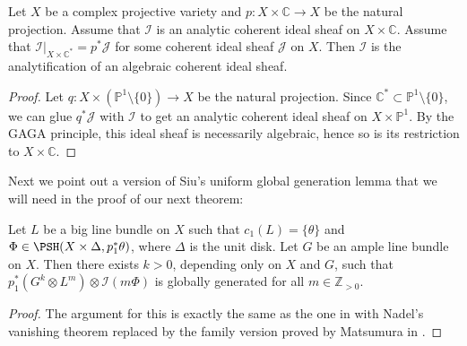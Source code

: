 \begin{lemma}\label{lma:GAGA}
Let $X$ be a complex projective variety and $p:X\times \mathbb{C}\rightarrow X$ be the natural projection. Assume that $\mathcal{I}$ is an analytic coherent ideal sheaf on $X\times \mathbb{C}$. Assume that $\mathcal{I}|_{X \times \mathbb C^*}=p^*\mathcal{J}$ for some coherent ideal sheaf $\mathcal{J}$ on $X$. Then $\mathcal{I}$ is the analytification of an algebraic coherent ideal sheaf.
\end{lemma}



\begin{proof}
    Let $q:X\times (\mathbb{P}^1\setminus \{0\})\rightarrow X$ be the natural projection. Since $\mathbb C^* \subset \mathbb{P}^1\setminus \{0\}$, we can glue $q^*\mathcal{J}$ with $\mathcal{I}$ to get an analytic coherent ideal sheaf on $X\times \mathbb{P}^1$. By the GAGA principle, this ideal sheaf is necessarily algebraic, hence so is its restriction to $X\times \mathbb{C}$.
\end{proof}

Next we point out a version of Siu's uniform global generation lemma \cite{Siu88} that we will need in the proof of our next theorem:

\begin{lemma}\label{lma:Siu_global_uniform_generatedness} Let $L$ be a big line bundle on $X$ such that $c_1(L) = \{\theta\}$ and $\Phi \in \PSH(X\times \Delta, p_1^*\theta)$, where $\Delta$ is the unit disk. Let $G$ be an ample line bundle on $X$. Then there exists $k>0$, depending only on $X$ and $G$, such that $p_1^*(G^k \otimes L^m)\otimes \mathcal I(m \Phi)$ is globally generated for all $m \in \mathbb{Z}_{>0}$.
\end{lemma}

\begin{proof} The argument for this is exactly the same as the one in \cite[Lemma~5.6]{BBJ21} with Nadel's vanishing theorem replaced by the family version proved by Matsumura in \cite[Theorem~1.7]{Mat16}.
\end{proof}







